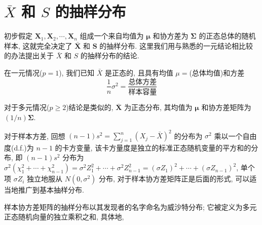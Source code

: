 \section{$\bar{X}$ 和 $S$ 的抽样分布}
\label{sec:4.4}

初步假定 $\mathbf{X}_{1},\mathbf{X}_{2},\cdots,\mathbf{X}_{n}$ 组成一个来自均值为 $\boldsymbol{\mu}$ 和协方差为 $\boldsymbol{\Sigma}$ 的正态总体的随机样本, 这就完全决定了 $\bar{\mathbf{X}}$ 和 $\mathbf{S}$ 的抽样分布. 这里我们用与熟悉的一元结论相比较的办法提出关于 $\bar{X}$ 和 $S$ 的抽样分布的结论.

在一元情况($p=1$), 我们已知 $\bar{X}$ 是正态的, 且具有均值 $\mu=$(总体均值)和方差
\[
\frac{1}{n}\sigma^{2}=\frac{\text{总体方差}}{\text{样本容量}}
\]

对于多元情况($p\geq 2$)结论是类似的, $\bar{\mathbf{X}}$ 为正态分布, 其均值为 $\boldsymbol{\mu}$ 和协方差矩阵为 $(1/n)\boldsymbol{\Sigma}$.

对于样本方差, 回想 $(n-1)s^{2}=\sum_{j=1}^{n}(X_{j}-\bar{X})^{2}$ 的分布为 $\sigma^{2}$ 乘以一个自由度(d.f.)为 $n-1$ 的卡方变量, 该卡方量度是独立的标准正态随机变量的平方和的分布, 即 $(n-1)s^{2}$ 分布为 $\sigma^{2}(\chi_{1}^{2}+\cdots+\chi_{n-1}^{2})=\sigma^{2}Z_{1}^{2}+\cdots+\sigma^{2}Z_{n-1}^{2}=(\sigma Z_{1})^{2}+\cdots+(\sigma Z_{n-1})^{2}$, 单个项 $\sigma Z_{i}$ 独立地服从 $N(0,\sigma^{2})$ 分布, 对于样本协方差矩阵正是后面的形式, 可以适当地推广到基本抽样分布.

样本协方差矩阵的抽样分布以其发现者的名字命名为威沙特分布; 它被定义为多元正态随机向量的独立乘积之和, 具体地,

